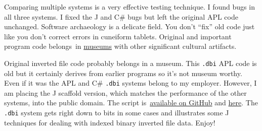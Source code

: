 Comparing multiple systems is a very effective testing technique. I
found bugs in all three systems. I fixed the J and C\# bugs but left the
original APL code unchanged. Software archaeology is a delicate field.
You don't ``fix'' old code just like you don't correct errors in
cuneiform tablets. Original and important program code belongs~in
\href{http://www.computerhistory.org/}{museums} with other significant
cultural artifacts.

Original inverted file code probably belongs in a museum. This
\texttt{.dbi} APL code is old but it certainly derives from earlier
programs so it's not museum worthy. Even if it was the APL and C\#
\texttt{.dbi} systems belong to my employer. However, I am placing the J
scaffold version, which matches the performance of the other systems,
into the public domain. The script
is~\href{https://github.com/bakerjd99/jacks/tree/master/dbi}{available
on GitHub} and \href{https://app.box.com/s/adjak1r4kn0u931yl3r2}{here}.
The \texttt{.dbi} system gets right down to bits in some cases and
illustrates some J techniques for dealing with indexed binary inverted
file data. Enjoy!






%